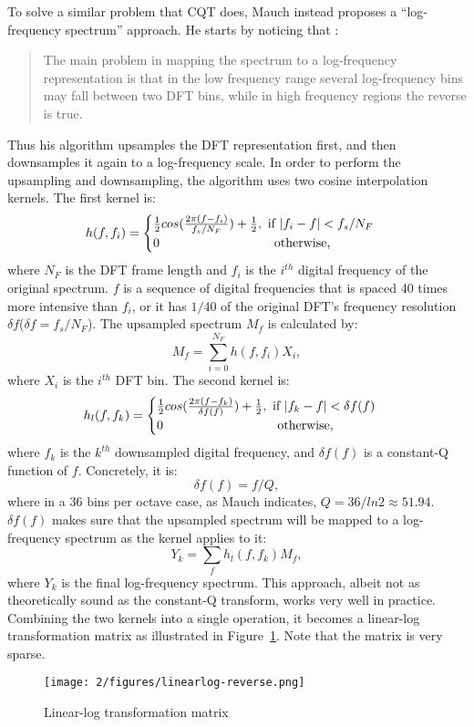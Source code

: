 To solve a similar problem that CQT does, Mauch instead proposes a ``log-frequency spectrum'' approach. He starts by noticing that \cite{mauch2010automatic}:
\begin{quote}
The main problem in mapping the spectrum to a log-frequency representation is that in the low frequency range several log-frequency bins may fall between two DFT bins, while in high frequency regions the reverse is true.
\end{quote}
Thus his algorithm upsamples the DFT representation first, and then downsamples it again to a log-frequency scale. In order to perform the upsampling and downsampling, the algorithm uses two cosine interpolation kernels. The first kernel is:
\begin{equation}
h(f,f_i) = 
\begin{cases}
{1\over 2} cos ({2\pi (f-f_i) \over {f_s/N_F}}) + {1\over 2}, \text{ if } |f_i-f|<f_s/N_F\\
0 \quad\quad\quad\quad\quad\quad\quad\quad\quad\text{otherwise,}
\end{cases}
\end{equation}
where $N_F$ is the DFT frame length and $f_i$ is the $i^{th}$ digital frequency of the original spectrum. $f$ is a sequence of digital frequencies that is spaced 40 times more intensive than $f_i$, or it has $1/40$ of the original DFT's frequency resolution $\delta f$($\delta f=f_s/N_F$). The upsampled spectrum $M_f$ is calculated by:
\begin{equation}
M_f = \sum_{i=0}^{N_F} {h(f,f_i)X_i},
\end{equation}
where $X_i$ is the $i^{th}$ DFT bin. The second kernel is:
\begin{equation}
h_l(f,f_k) = 
\begin{cases}
{1\over 2} cos ({2\pi (f-f_k) \over {\delta f(f)}}) + {1\over 2}, \text{ if } |f_k-f|<\delta f(f)\\
0 \quad\quad\quad\quad\quad\quad\quad\quad\quad\text{otherwise,}
\end{cases}
\end{equation}
where $f_k$ is the $k^{th}$ downsampled digital frequency, and $\delta f(f)$ is a constant-Q function of $f$. Concretely, it is:
\begin{equation}
\delta f(f) = f/Q,
\end{equation}
where in a 36 bins per octave case, as Mauch indicates, $Q=36/ln2 \approx 51.94$. $\delta f(f)$ makes sure that the upsampled spectrum will be mapped to a log-frequency spectrum as the kernel applies to it:
\begin{equation}
Y_k = \sum_f h_l(f,f_k)M_f,
\end{equation}
where $Y_k$ is the final log-frequency spectrum. This approach, albeit not as theoretically sound as the constant-Q transform, works very well in practice. Combining the two kernels into a single operation, it becomes a linear-log transformation matrix as illustrated in Figure~\ref{fig:2-linearlog}. Note that the matrix is very sparse.
\begin{figure}[htb]
\centering
\texttt{[image: 2/figures/linearlog-reverse.png]}
\caption{Linear-log transformation matrix}
\label{fig:2-linearlog}
\end{figure}

